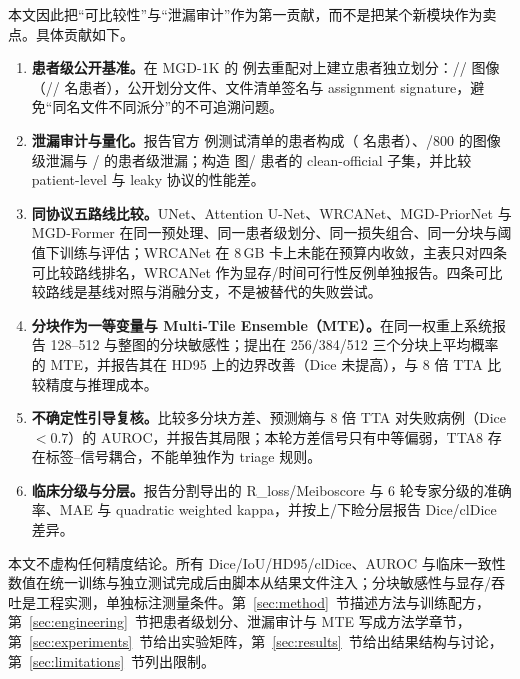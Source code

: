 本文因此把“可比较性”与“泄漏审计”作为第一贡献，而不是把某个新模块作为卖点。具体贡献如下。

\begin{enumerate}[label=(\arabic*)]
\item \textbf{患者级公开基准。}在 MGD-1K 的 \nTotal{} 例去重配对上建立患者独立划分：\nTrain/\nVal/\nTest{} 图像（\nTrainPatients/\nValPatients/\nTestPatients{} 名患者），公开划分文件、文件清单签名与 assignment signature，避免“同名文件不同派分”的不可追溯问题。
\item \textbf{泄漏审计与量化。}报告官方 \officialTestImages{} 例测试清单的患者构成（\officialTestPatients{} 名患者）、\officialLeakImages/800{} 的图像级泄漏与 \officialLeakPatients/\officialTestPatients{} 的患者级泄漏；构造 \cleanOfficialImages{} 图/\cleanOfficialPatients{} 患者的 clean-official 子集，并比较 patient-level 与 leaky 协议的性能差。
\item \textbf{同协议五路线比较。}UNet、Attention U-Net、WRCANet、MGD-PriorNet 与 MGD-Former 在同一预处理、同一患者级划分、同一损失组合、同一分块与阈值下训练与评估；WRCANet 在 8\,GB 卡上未能在预算内收敛，主表只对四条可比较路线排名，WRCANet 作为显存/时间可行性反例单独报告。四条可比较路线是基线对照与消融分支，不是被替代的失败尝试。
\item \textbf{分块作为一等变量与 Multi-Tile Ensemble（MTE）。}在同一权重上系统报告 128--512 与整图的分块敏感性；提出在 256/384/512 三个分块上平均概率的 MTE，并报告其在 HD95 上的边界改善（Dice 未提高），与 8 倍 TTA 比较精度与推理成本。
\item \textbf{不确定性引导复核。}比较多分块方差、预测熵与 8 倍 TTA 对失败病例（Dice $<0.7$）的 AUROC，并报告其局限；本轮方差信号只有中等偏弱，TTA8 存在标签--信号耦合，不能单独作为 triage 规则。
\item \textbf{临床分级与分层。}报告分割导出的 R\_loss/Meiboscore 与 6 轮专家分级的准确率、MAE 与 quadratic weighted kappa，并按上/下睑分层报告 Dice/clDice 差异。
\end{enumerate}

本文不虚构任何精度结论。所有 Dice/IoU/HD95/clDice、AUROC 与临床一致性数值在统一训练与独立测试完成后由脚本从结果文件注入；分块敏感性与显存/吞吐是工程实测，单独标注测量条件。第~\ref{sec:method}~节描述方法与训练配方，第~\ref{sec:engineering}~节把患者级划分、泄漏审计与 MTE 写成方法学章节，第~\ref{sec:experiments}~节给出实验矩阵，第~\ref{sec:results}~节给出结果结构与讨论，第~\ref{sec:limitations}~节列出限制。

